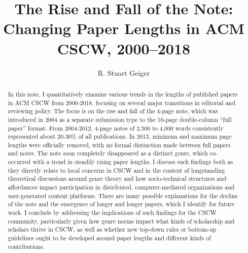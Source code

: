 \documentclass[format=acmsmall, screen=true]{acmart}
\begin{document}
%
\title{The Rise and Fall of the Note: Changing Paper Lengths in ACM CSCW, 2000--2018}


\author{R. Stuart Geiger}



%
\renewcommand{\shortauthors}{Geiger}

%
\begin{abstract}
In this note, I quantitatively examine various trends in the lengths of published papers in ACM CSCW from 2000-2018, focusing on several major transitions in editorial and reviewing policy. The focus is on the rise and fall of the 4-page note, which was introduced in 2004 as a separate submission type to the 10-page double-column ``full paper'' format. From 2004-2012, 4-page notes of 2,500 to 4,000 words consistently represented about 20-30\% of all publications. In 2013, minimum and maximum page lengths were officially removed, with no formal distinction made between full papers and notes. The note soon completely disappeared as a distinct genre, which co-occurred with a trend in steadily rising paper lengths. I discuss such findings both as they directly relate to local concerns in CSCW and in the context of longstanding theoretical discussions around genre theory and how socio-technical structures and affordances impact participation in distributed, computer-mediated organizations and user-generated content platforms. There are many possible explanations for the decline of the note and the emergence of longer and longer papers, which I identify for future work. I conclude by addressing the implications of such findings for the CSCW community, particularly given how genre norms impact what kinds of scholarship and scholars thrive in CSCW, as well as whether new top-down rules or bottom-up guidelines ought to be developed around paper lengths and different kinds of contributions.
\end{abstract}
\end{document}
